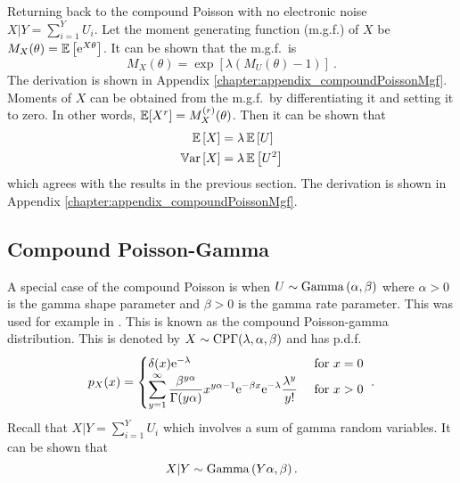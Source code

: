 Returning back to the compound Poisson with no electronic noise $X|Y = \sum_{i=1}^{Y}U_i$. Let the moment generating function (m.g.f.) of $X$ be $M_X(\theta)=\operatorname{\mathbb{E}}\left[\mathrm{e}^{X\theta}\right]$. It can be shown that the m.g.f.~is
\begin{equation}
  M_X(\theta)=
  \exp\left[
    \lambda
    \left(
      M_U(\theta)-1
    \right)
  \right] \ .
\end{equation}
The derivation is shown in Appendix \ref{chapter:appendix_compoundPoissonMgf}. Moments of $X$ can be obtained from the m.g.f.~by differentiating it and setting it to zero. In other words, $\operatorname{\mathbb{E}}[X^r]=M_X^{(r)}(\theta)$. Then it can be shown that
\begin{align}
  \operatorname{\mathbb{E}}\left[X\right]&=\lambda\operatorname{\mathbb{E}}\left[U\right]
  \\
  \operatorname{\mathbb{V}ar}\left[X\right] &= \lambda\operatorname{\mathbb{E}}\left[U^2\right]
\end{align}
which agrees with the results in the previous section. The derivation is shown in Appendix \ref{chapter:appendix_compoundPoissonMgf}.

\subsection{Compound Poisson-Gamma}

A special case of the compound Poisson is when $U\sim\operatorname{Gamma}\left(\alpha,\beta\right)$ where $\alpha>0$ is the gamma shape parameter and $\beta>0$ is the gamma rate parameter. This was used for example in \cite{xu2009electronic}. This is known as the compound Poisson-gamma distribution. This is denoted by $X\sim\operatorname{CP\Gamma}(\lambda,\alpha,\beta)$ and has p.d.f.
\begin{equation}
  p_X(x) = 
  \begin{cases}
    \delta(x) \mathrm{e}^{-\lambda} & \text{ for } x=0 \\ 
    \displaystyle\sum_{y=1}^{\infty}\dfrac{\beta^{y\alpha}}{\Gamma(y\alpha)}x^{y\alpha-1}\mathrm{e}^{-\beta x}\mathrm{e}^{-\lambda}\frac{\lambda^y}{y!} & \text{ for } x>0
  \end{cases}
  \ .
  \label{eq:compoundPoisson_pdf}
\end{equation}
Recall that $X|Y=\sum_{i=1}^YU_i$ which involves a sum of gamma random variables. It can be shown that
\begin{equation}
  X|Y\sim\operatorname{Gamma}\left(Y\alpha,\beta\right).
\end{equation}

